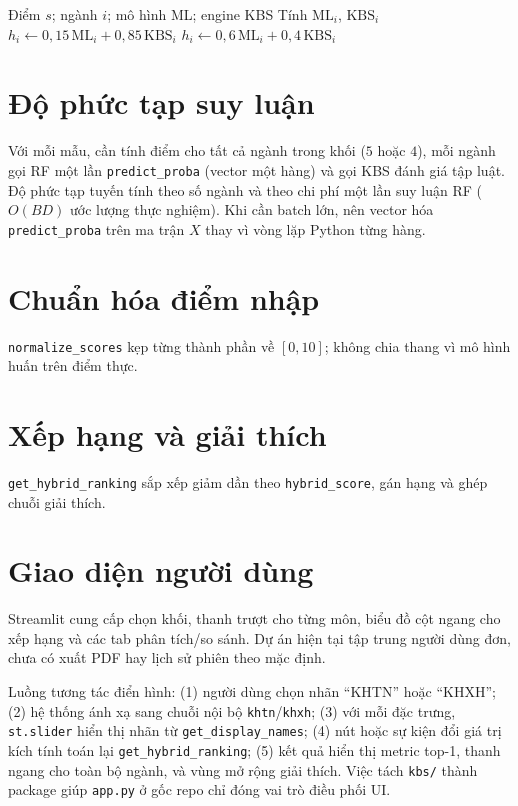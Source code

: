 \begin{algorithm}[!htbp]
\caption{Lai ghép có VETO (mức logic, rút gọn)}
\label{alg:veto}
\begin{algorithmic}[1]
\Require Điểm $s$; ngành $i$; mô hình ML; engine KBS
\State Tính $\text{ML}_i$, $\text{KBS}_i$
    \State $h_i \gets 0{,}15\,\text{ML}_i + 0{,}85\,\text{KBS}_i$ 
\Else
    \State $h_i \gets 0{,}6\,\text{ML}_i + 0{,}4\,\text{KBS}_i$
\EndIf
\end{algorithmic}
\end{algorithm}
\FloatBarrier

\section{Độ phức tạp suy luận}
Với mỗi mẫu, cần tính điểm cho tất cả ngành trong khối ($5$ hoặc $4$), mỗi ngành gọi RF một lần \texttt{predict\_proba} (vector một hàng) và gọi KBS đánh giá tập luật. Độ phức tạp tuyến tính theo số ngành và theo chi phí một lần suy luận RF ($O(B D)$ ước lượng thực nghiệm). Khi cần batch lớn, nên vector hóa \texttt{predict\_proba} trên ma trận $X$ thay vì vòng lặp Python từng hàng.

\section{Chuẩn hóa điểm nhập}
\texttt{normalize\_scores} kẹp từng thành phần về $[0,10]$; không chia thang vì mô hình huấn trên điểm thực.

\section{Xếp hạng và giải thích}
\texttt{get\_hybrid\_ranking} sắp xếp giảm dần theo \texttt{hybrid\_score}, gán hạng và ghép chuỗi giải thích.

\section{Giao diện người dùng}
Streamlit cung cấp chọn khối, thanh trượt cho từng môn, biểu đồ cột ngang cho xếp hạng và các tab phân tích/so sánh. Dự án hiện tại tập trung người dùng đơn, chưa có xuất PDF hay lịch sử phiên theo mặc định.

Luồng tương tác điển hình: (1) người dùng chọn nhãn ``KHTN'' hoặc ``KHXH''; (2) hệ thống ánh xạ sang chuỗi nội bộ \texttt{khtn}/\texttt{khxh}; (3) với mỗi đặc trưng, \texttt{st.slider} hiển thị nhãn từ \texttt{get\_display\_names}; (4) nút hoặc sự kiện đổi giá trị kích tính toán lại \texttt{get\_hybrid\_ranking}; (5) kết quả hiển thị metric top-1, thanh ngang cho toàn bộ ngành, và vùng mở rộng giải thích. Việc tách \texttt{kbs/} thành package giúp \texttt{app.py} ở gốc repo chỉ đóng vai trò điều phối UI.

